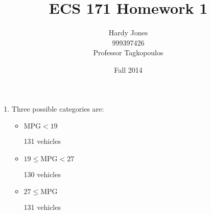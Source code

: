 \documentclass[12pt,letterpaper]{article}
\title{ECS 171 Homework 1\vspace{-2ex}}
\author{Hardy Jones\\
        999397426\\
        Professor Tagkopoulos\vspace{-2ex}}
\date{Fall 2014}
\newcommand{\MPG}[0]{\text{MPG}}
\begin{document}
  \maketitle

  \begin{enumerate}
    \item
      Three possible categories are:
        \begin{itemize}
          \item $\MPG < 19$

            131 vehicles

          \item $19 \le \MPG < 27$

            130 vehicles

          \item $27 \le \MPG$

            131 vehicles

        \end{itemize}
  \end{enumerate}
\end{document}
